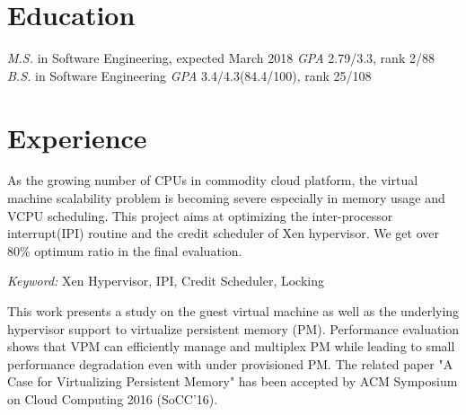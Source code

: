 \documentclass{resume}
\begin{document}


 
\section{Education}
\textit{M.S.} in Software Engineering, expected March 2018
\textit{GPA} 2.79/3.3, rank 2/88
\textit{B.S.} in Software Engineering
\textit{GPA} 3.4/4.3(84.4/100), rank 25/108



\section{Experience}

As the growing number of CPUs in commodity cloud platform, the virtual machine scalability problem is becoming severe especially in memory usage and VCPU scheduling.
This project aims at optimizing the inter-processor interrupt(IPI) routine and the credit scheduler of Xen hypervisor. We get over 80\% optimum ratio in the final evaluation.

\textit{Keyword: } Xen Hypervisor, IPI, Credit Scheduler, Locking


This work presents a study on the guest virtual machine as well as the underlying hypervisor support to virtualize persistent memory (PM). 
Performance evaluation shows that VPM can efficiently manage and multiplex PM while leading to small performance degradation even with under provisioned PM. 
The related paper "A Case for Virtualizing Persistent Memory" has been accepted by ACM Symposium on Cloud Computing 2016 (SoCC'16).
\end{document}
